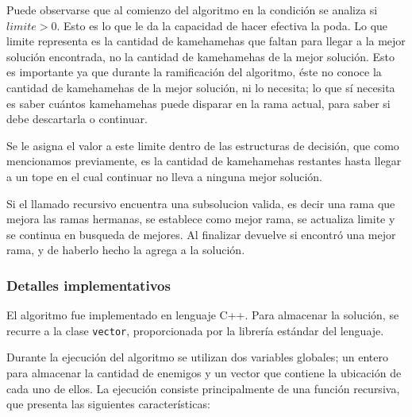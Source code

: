 \begin{enumerate}
        Puede observarse que al comienzo del algoritmo en la condición se analiza si $limite > 0$. Esto es lo que le da la capacidad de hacer efectiva la poda. 
        Lo que limite representa es la cantidad de kamehamehas que faltan para llegar a la mejor solución encontrada, no la cantidad de kamehamehas de la mejor solución. Esto es importante ya que durante la ramificación del algoritmo, éste no conoce la cantidad de kamehamehas de la mejor solución, ni lo necesita; lo que sí necesita es saber cuántos kamehamehas puede disparar en la rama actual, para saber si debe descartarla o continuar.

        Se le asigna el valor a este limite dentro de las estructuras de decisión, que como mencionamos previamente, es la cantidad de kamehamehas restantes hasta llegar a un tope en el cual continuar no lleva a ninguna mejor solución.

        Si el llamado recursivo encuentra una subsolucion valida, es decir una rama que mejora las ramas hermanas, se establece como mejor rama, se actualiza limite y se continua en busqueda de mejores. Al finalizar devuelve si encontró una mejor rama, y de haberlo hecho la agrega a la solución.

    \end{enumerate}

    \subsubsection{Detalles implementativos}
    
    El algoritmo fue implementado en lenguaje C++. Para almacenar la solución, se recurre a la clase \texttt{vector}, proporcionada por la librería estándar del lenguaje.

    Durante la ejecución del algoritmo se utilizan dos variables globales; un entero para almacenar la cantidad de enemigos y un vector que contiene la ubicación de cada uno de ellos. La ejecución consiste principalmente de una función recursiva, que presenta las siguientes características:

